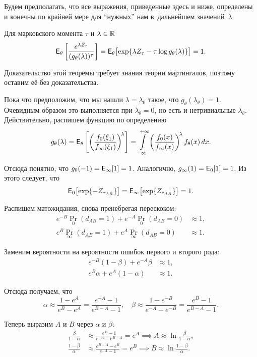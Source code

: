 Будем предполагать, что все выражения, приведенные здесь и ниже, определены и конечны по крайней мере для ``нужных'' нам в~дальнейшем значений~\(\lambda\). 

\begin{theorem}
	Для марковского момента \(\tau\) и \(\lambda \in \mathbb{R}\) 
	\[
		\E_{\theta}\left[\frac{e^{\lambda Z_{\tau}}}{(g_{\theta}(\lambda))^{\tau}}\right] = \E_{\theta}\bigl[\exp\{\lambda Z_{\tau} - \tau \log g_{\theta}(\lambda)\}\bigr] = 1.
	\]
\end{theorem}

Доказательство этой теоремы требует знания теории мартингалов, поэтому оставим её без доказательства.

Пока что предположим, что мы нашли \(\lambda = \lambda_{0}\) такое, что \(g_{\theta}(\lambda_{\theta}) = 1\). Очевидным образом это выполняется при \(\lambda_{\theta} = 0\), но есть и нетривиальные \(\lambda_{\theta}\). Действительно, распишем функцию по определению
\[
	g_{\theta}(\lambda) = \E_{\theta}\left[\biggl(\frac{f_{0}(\xi_{1})}{f_{\infty}(\xi_{1})}\biggr)^{\!\lambda}\right] = \int\limits_{-\infty}^{+\infty} \left(\frac{f_{0}(x)}{f_{\infty}(x)}\right)^{\!\lambda} f_{\theta}(x)\diff x.
\]

Отсюда понятно, что \(g_{0}(-1) = \E_{\infty}[1] = 1\). Аналогично, \(g_{\infty}(1) = \E_{0}[1] = 1\). Из этого следует, что 
\[
	\E_{0}\bigl[\exp\{-Z_{\tau_{AB}}\}\bigr] = \E_{\infty}\bigl[\exp\{Z_{\tau_{AB}}\}\bigr] = 1.
\]

Распишем матожидания, снова пренебрегая перескоком: 
\begin{align*}
	e^{-B}\Pr_{0}(d_{AB} = 1) + e^{-A}\Pr_{0}(d_{AB} = 0) &\approx 1, \\
	e^{B}\Pr_{\infty}(d_{AB} = 1) + e^{A}\Pr_{\infty}(d_{AB} = 0) &\approx 1.
\end{align*}

Заменим вероятности на вероятности ошибок первого и второго рода:
\begin{align*}
	e^{-B}(1 - \beta) + e^{-A}\beta &\approx 1, \\
	e^{B}\alpha + e^{A}(1 - \alpha) &\approx 1.
\end{align*}

Отсюда получаем, что
\[
	\alpha \approx \frac{1 - e^{A}}{e^{B} - e^{A}} = \frac{e^{-A} - 1}{e^{B - A} - 1}, \quad \beta \approx \frac{1 - e^{-B}}{e^{-A} - e^{-B}} = \frac{e^{B} - 1}{e^{B - A} - 1}.
\]

Теперь выразим \(A\) и \(B\) через \(\alpha\) и \(\beta\):
\begin{align*}
	\frac{\beta}{1 - \alpha} &\approx \frac{e^{B} - 1}{e^{-A} - e^{B - A}} = e^{A} \implies A \approx \ln\frac{\beta}{1 - \alpha}, \\
	\frac{1 - \beta}{\alpha} &\approx \frac{e^{B - A} - e^{B}}{e^{-A} - 1} = e^{B} \implies B \approx \ln\frac{1 - \beta}{\alpha}.
\end{align*}

